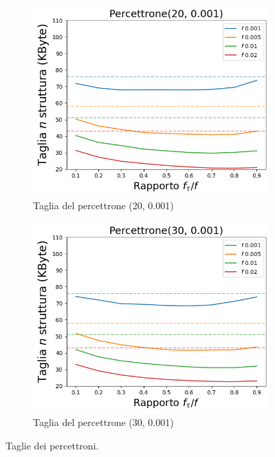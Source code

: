 \documentclass[../../main.tex]{subfiles}
\begin{document}
    \begin{figure}[H]
        \centering
        \begin{subfigure}[b]{0.49\textwidth}
            \centering
            \includegraphics[width = \textwidth]{immagini/7/LBF/Percettrone(20, 0.001)_Taglia.png}
            \caption{Taglia del percettrone (20, 0.001)}
            \label{fig:LBFTagliaPercettrone20}
        \end{subfigure}
        \begin{subfigure}[b]{0.49\textwidth}
            \centering
            \includegraphics[width = \textwidth]{immagini/7/LBF/Percettrone(30, 0.001)_Taglia.png}
            \caption{Taglia del percettrone (30, 0.001)}
            \label{fig:LBFTagliaPercettrone30}
        \end{subfigure}
        \caption{Taglie dei percettroni.}
        \label{fig:tagliePercettroniLBF}
    \end{figure}
\end{document}
